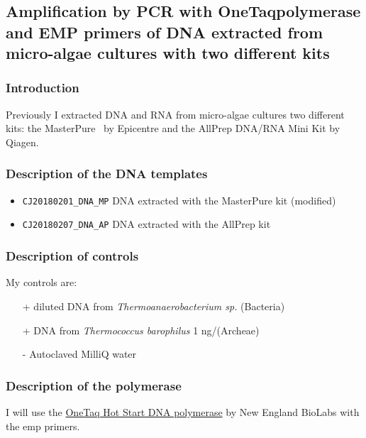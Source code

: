 \subsection{Amplification by PCR with OneTaq\cR polymerase and EMP primers of DNA extracted from micro-algae cultures with two different kits}
\label{task:20180208_cj2}

\subsubsection{Introduction}
Previously I extracted DNA and RNA from micro-algae cultures two different kits: the MasterPure\texttrademark~ by Epicentre and the AllPrep DNA/RNA Mini Kit by Qiagen.

\subsubsection{Description of the DNA templates}
\begin{itemize}
\item \texttt{CJ20180201\_DNA\_MP} DNA extracted with the MasterPure kit (modified)
\item \texttt{CJ20180207\_DNA\_AP} DNA extracted with the AllPrep kit
\end{itemize}


\subsubsection{Description of controls}
My controls are:
\begin{itemize}
\item[+] diluted DNA from \textit{Thermoanaerobacterium sp.} (Bacteria)
\item[+] DNA from \textit{Thermococcus barophilus} 1 ng/\uL (Archeae)
\item[-] Autoclaved MilliQ water
\end{itemize}


\subsubsection{Description of the polymerase}

I will use the \href{https://www.neb.com/products/m0481-onetaq-hot-start-dna-polymerase#Product%20Information}{OneTaq Hot Start DNA polymerase} by New England BioLabs with the \gls{emp} primers.


